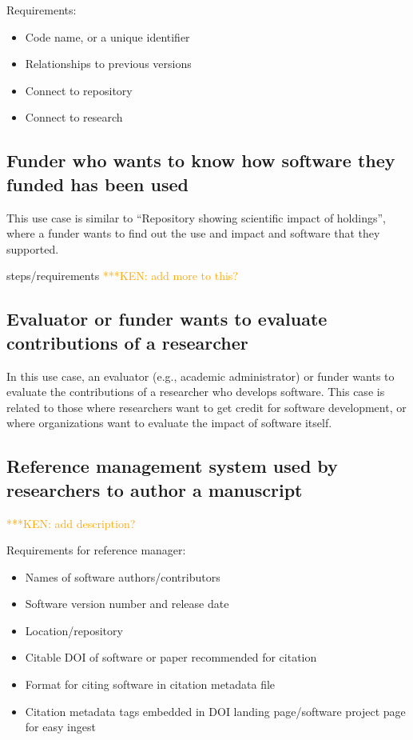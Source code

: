 \documentclass[12pt, oneside]{amsart}
\newcommand{\niemnote}[1]{ {\textcolor{orange} { ***KEN: #1 }}} %
\begin{document}
Requirements:
\begin{itemize}
\item Code name, or a unique identifier
\item Relationships to previous versions
\item Connect to repository
\item Connect to research
\end{itemize}

\subsection{Funder who wants to know how software they funded has been used}

This use case is similar to ``Repository showing scientific impact of holdings'',
where a funder wants to find out the use and impact and software that they
supported.

steps/requirements\niemnote{add more to this?}

\subsection{Evaluator or funder wants to evaluate contributions of a researcher}

In this use case, an evaluator (e.g., academic administrator) or funder wants
to evaluate the contributions of a researcher who develops software. This case
is related to those where researchers want to get credit for software
development, or where organizations want to evaluate the impact of software
itself.

\subsection{Reference management system used by researchers to author a manuscript}

\niemnote{add description?}

Requirements for reference manager:
\begin{itemize}
\item Names of software authors/contributors
\item Software version number and release date
\item Location/repository
\item Citable DOI of software or paper recommended for citation
\item Format for citing software in citation metadata file
\item Citation metadata tags embedded in DOI landing page/software project page for easy ingest
\end{itemize}
\end{document}
